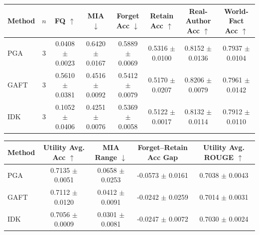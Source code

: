 \begin{tabular}{lccccccc}
\hline
Method & $n$ & FQ $\uparrow$ & MIA $\downarrow$ & Forget Acc $\downarrow$ & Retain Acc $\uparrow$ & Real-Author Acc $\uparrow$ & World-Fact Acc $\uparrow$ \\
\hline
PGA & 3 & 0.0408 $\pm$ 0.0023 & 0.6420 $\pm$ 0.0167 & 0.5889 $\pm$ 0.0069 & 0.5316 $\pm$ 0.0100 & 0.8152 $\pm$ 0.0136 & 0.7937 $\pm$ 0.0104 \\
GAFT & 3 & 0.5610 $\pm$ 0.0381 & 0.4516 $\pm$ 0.0092 & 0.5412 $\pm$ 0.0079 & 0.5170 $\pm$ 0.0207 & 0.8206 $\pm$ 0.0079 & 0.7961 $\pm$ 0.0142 \\
IDK & 3 & 0.1052 $\pm$ 0.0406 & 0.4251 $\pm$ 0.0076 & 0.5369 $\pm$ 0.0058 & 0.5122 $\pm$ 0.0017 & 0.8132 $\pm$ 0.0114 & 0.7912 $\pm$ 0.0110 \\
\hline
\end{tabular}

\begin{tabular}{lcccc}
\hline
Method & Utility Avg. Acc $\uparrow$ & MIA Range $\downarrow$ & Forget--Retain Acc Gap & Utility Avg. ROUGE $\uparrow$ \\
\hline
PGA & 0.7135 $\pm$ 0.0051 & 0.0658 $\pm$ 0.0253 & -0.0573 $\pm$ 0.0161 & 0.7038 $\pm$ 0.0043 \\
GAFT & 0.7112 $\pm$ 0.0120 & 0.0412 $\pm$ 0.0091 & -0.0242 $\pm$ 0.0259 & 0.7014 $\pm$ 0.0031 \\
IDK & 0.7056 $\pm$ 0.0009 & 0.0301 $\pm$ 0.0081 & -0.0247 $\pm$ 0.0072 & 0.7030 $\pm$ 0.0024 \\
\hline
\end{tabular}
